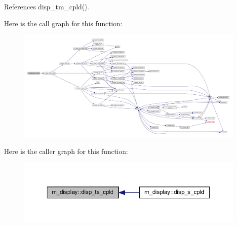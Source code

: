 


References disp\+\_\+tm\+\_\+cpld().

Here is the call graph for this function\+:
\nopagebreak
\begin{figure}[H]
\begin{center}
\leavevmode
\includegraphics[width=350pt]{namespacem__display_a24143f6afc313e16d2a8961067ec9019_cgraph}
\end{center}
\end{figure}
Here is the caller graph for this function\+:
\nopagebreak
\begin{figure}[H]
\begin{center}
\leavevmode
\includegraphics[width=350pt]{namespacem__display_a24143f6afc313e16d2a8961067ec9019_icgraph}
\end{center}
\end{figure}
\mbox{\label{namespacem__display_a008a43400dfc972afef14c2c6d1ddbf3}} 
